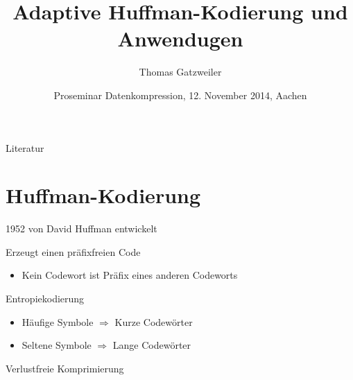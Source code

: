 \documentclass[xcolor=dvipsnames,presentation]{beamer}    %
\title[Adaptive Huffman-Kodierung und Anwendungen]{Adaptive Huffman-Kodierung und Anwendugen}
\author[Gatzweiler]{Thomas Gatzweiler}
\institute[RWTH Aachen University] %
{
  \strut Human Language Technology and Pattern Recognition\\
  \strut Computer Science Department, RWTH Aachen University %
}
\date[12. November 2014]{Proseminar Datenkompression, 12. November 2014, Aachen}
\newenvironment{witemize}{\itemize\setlength{\itemsep}{1em}}{\enditemize}
\begin{document}
\nocite{*}

\begin{frame}[label=titlepage]
  \titlepage
\end{frame}


%




\begin{frame}[allowframebreaks]{Literatur}
 
 
\end{frame}


\section{Huffman-Kodierung}

\begin{frame}[<+->]{\insertsection}
  \begin{witemize}
    \item 1952 von David Huffman entwickelt
    \item Erzeugt einen präfixfreien Code
      \begin{itemize}
        \item{Kein Codewort ist Präfix eines anderen Codeworts}
      \end{itemize}
    \item Entropiekodierung
      \begin{itemize}
        \item Häufige Symbole $\Rightarrow$ Kurze Codewörter
        \item Seltene Symbole $\Rightarrow$ Lange Codewörter
      \end{itemize}
    \item Verlustfreie Komprimierung
  \end{witemize}
\end{frame}
\end{document}
